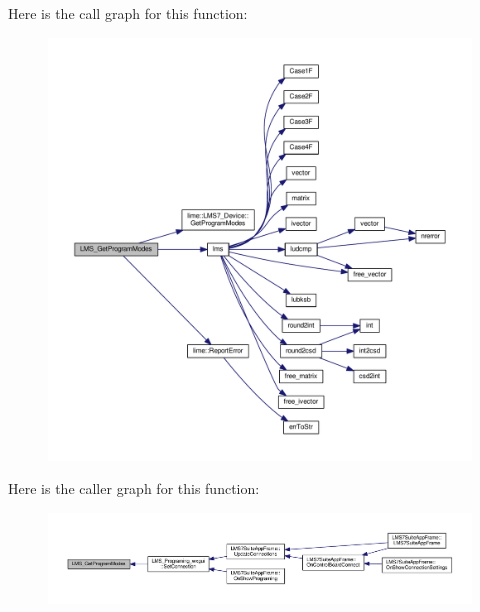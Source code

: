 Here is the call graph for this function\+:
\nopagebreak
\begin{figure}[H]
\begin{center}
\leavevmode
\includegraphics[width=350pt]{df/de1/lms7__api_8cpp_a10bb9c9c3d45543be59d29908bde7ba9_cgraph}
\end{center}
\end{figure}




Here is the caller graph for this function\+:
\nopagebreak
\begin{figure}[H]
\begin{center}
\leavevmode
\includegraphics[width=350pt]{df/de1/lms7__api_8cpp_a10bb9c9c3d45543be59d29908bde7ba9_icgraph}
\end{center}
\end{figure}



